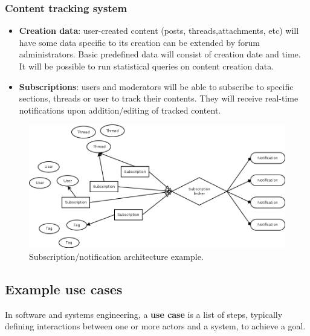 \documentclass[12pt]{report}
\renewcommand\emph{\textbf}
\begin{document}
                      \subsubsection{Content tracking system}
                        \begin{itemize}
                            \item \emph{Creation data}: user-created content (posts, threads,attachments, etc) will have some data specific to its creation can be extended by forum administrators. Basic predefined data will consist of creation date and time. It will be possible to run statistical queries on content creation data.
                            \item \emph{Subscriptions}: users and moderators will be able to subscribe to specific sections, threads or user to track their contents. They will receive real-time notifications upon addition/editing of tracked content.
                        \end{itemize}

                        \begin{figure}[h]
                        \caption{Subscription/notification architecture example.}
                        \centering
                        \includegraphics[width=1\textwidth]{ed/hier_sub}
                        \end{figure}

                \newpage

                \subsection{Example use cases}
                    In software and systems engineering, a \emph{use case} is a list of steps, typically defining interactions between one or more actors and a system, to achieve a goal.
\end{document}
